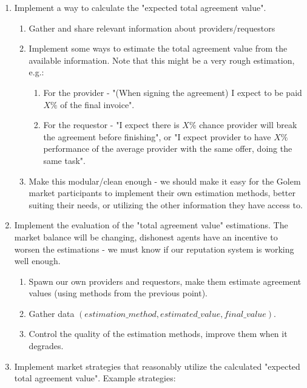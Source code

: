 \documentclass{article}
\begin{document}
\begin{enumerate}
    \item Implement a way to calculate the "expected total agreement value".
        \begin{enumerate}
            \item Gather and share relevant information about providers/requestors
            \item Implement some ways to estimate the total agreement value from the available information.
                Note that this might be a very rough estimation, e.g.:
                \begin{enumerate}
                    \item For the provider - "(When signing the agreement) I expect to be paid $X\%$ of the final invoice".
                    \item For the requestor - "I expect there is $X\%$ chance provider will break the agreement before finishing", 
                        or "I expect provider to have $X\%$ performance of the average provider with the same offer, doing the same task".
                \end{enumerate}
            \item Make this modular/clean enough - we should make it easy for the Golem market participants 
                to implement their own estimation methods, better suiting their needs, or utilizing the other information they have access to.
        \end{enumerate}
    \item Implement the evaluation of the "total agreement value" estimations. The market balance will be changing, dishonest agents have an incentive
        to worsen the estimations - we must know if our reputation system is working well enough.
        \begin{enumerate}
            \item Spawn our own providers and requestors, make them estimate agreement values (using methods from the previous point).
            \item Gather data $(estimation\_method, estimated\_value, final\_value)$.
            \item Control the quality of the estimation methods, improve them when it degrades.
        \end{enumerate}
    \item Implement market strategies that reasonably utilize the calculated "expected total agreement value". 
        Example strategies:
        \begin{enumerate}

\end{enumerate}
\end{enumerate}
\end{document}
